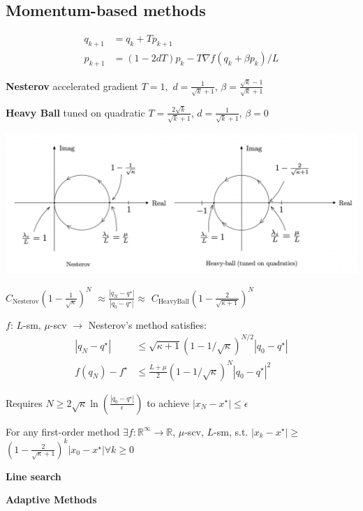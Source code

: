 \subsection{Momentum-based methods}

\[\begin{aligned}
		q_{k+1} & = q_k + Tp_{k+1}                          \\
		p_{k+1} & = (1-2dT)p_k-T\nabla f(q_k + \beta p_k)/L
	\end{aligned}\]

\textbf{Nesterov}
accelerated gradient
$T = 1,$
$d=\frac{1}{\sqrt{k}+1}$,
$\beta =\frac{\sqrt{k}-1}{\sqrt{k}+1}$

\textbf{Heavy Ball}
tuned on quadratic
$T = \frac{2\sqrt{k}}{\sqrt{k}+1}$,
$d=\frac{1}{\sqrt{k}+1}$,
$\beta=0$

\includegraphics[width=\columnwidth]{images/root-locus-momentum.png}

\begin{centering}
	$C_\text{Nesterov}(1-\frac{1}{\sqrt{\kappa}})^N$
	$\approx\frac{|q_N-q^\star|}{|q_0-q^\star|}\approx$
	$C_\text{HeavyBall}(1-\frac{2}{\sqrt{\kappa+1}})^N$
\end{centering}

\begin{theorem}
	$f$: $L$-sm, $\mu$-scv
	$\rightarrow$
	Nesterov's method satisfies:
	\[  \begin{aligned}
			|q_N-q^\star|  & \le
			\sqrt{\kappa+1}(1-1/\sqrt{\kappa})^{N/2}|q_0-q^\star|
			\\
			f(q_N)-f^\star & \le
			\frac{L+\mu}{2}(1-1/\sqrt{\kappa})^{N}|q_0-q^\star|^2
		\end{aligned}\]
\end{theorem}


Requires
$N\ge2\sqrt{\kappa}\operatorname{ln}(\frac{|q_{0}-q^\star|}{\epsilon})$
to achieve
$|x_{N}-x^\star|\le\epsilon$

\begin{theorem}
	For any first-order method
	$\exists f: \mathbb{R}^{\infty}\rightarrow\mathbb{R}$,
	$\mu$-scv, $L$-sm,
	s.t.
	$|x_k - x^\star|\ge$
	$(1-\frac{2}{\sqrt{\kappa}+1})^k|x_0 - x^\star| \forall k\ge 0$

\end{theorem}

\textbf{Line search}

\textbf{Adaptive Methods}
